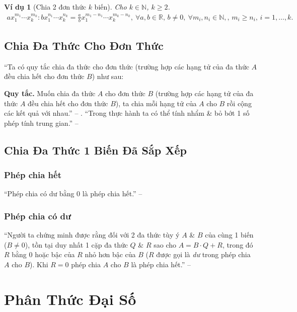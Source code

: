 \documentclass{article}
\numberwithin{equation}{section}
\newtheorem{vidu}{Ví dụ}[section]
\begin{document}
\begin{vidu}[Chia 2 đơn thức $k$ biến]
	Cho $k\in\mathbb{N}$, $k\ge 2$.
	\begin{align*}
		ax_1^{m_1}\cdots x_k^{m_k}:bx_1^{n_1}\cdots x_k^{n_k} = \frac{a}{b}x_1^{m_1 - n_1}\cdots x_k^{m_k - n_k},\ \forall a,b\in\mathbb{R},\,b\ne 0,\ \forall m_i,n_i\in\mathbb{N},,\,m_i\ge n_i,\,i = 1,\ldots,k.
	\end{align*}
\end{vidu}

\subsection{Chia Đa Thức Cho Đơn Thức}
``Ta có quy tắc chia đa thức cho đơn thức (trường hợp các hạng tử của đa thức $A$ đều chia hết cho đơn thức $B$) như sau:

\textbf{Quy tắc.} Muốn chia đa thức $A$ cho đơn thức $B$ (trường hợp các hạng tử của đa thức $A$ đều chia hết cho đơn thức $B$), ta chia mỗi hạng tử của $A$ cho $B$ rồi cộng các kết quả với nhau.'' -- \cite[p. 27]{SGK_Toan_8_tap_1}. ``Trong thực hành ta có thể tính nhẩm \& bỏ bớt 1 số phép tính trung gian.'' -- \cite[p. 28]{SGK_Toan_8_tap_1}

\subsection{Chia Đa Thức 1 Biến Đã Sắp Xếp}

\subsubsection{Phép chia hết}
``Phép chia có dư bằng $0$ là phép chia hết.'' -- \cite[p. 30]{SGK_Toan_8_tap_1}

\subsubsection{Phép chia có dư}
``Người ta chứng minh được rằng đối với 2 đa thức tùy ý $A$ \& $B$ của cùng 1 biến ($B\ne 0$), tồn tại duy nhất 1 cặp đa thức $Q$ \& $R$ sao cho $A = B\cdot Q + R$, trong đó $R$ bằng 0 hoặc bậc của $R$ nhỏ hơn bậc của $B$ ($R$ được gọi là \textit{dư} trong phép chia $A$ cho $B$). Khi $R = 0$ phép chia $A$ cho $B$ là phép chia hết.'' -- \cite[p. 31]{SGK_Toan_8_tap_1}


\section{Phân Thức Đại Số}
\end{document}
